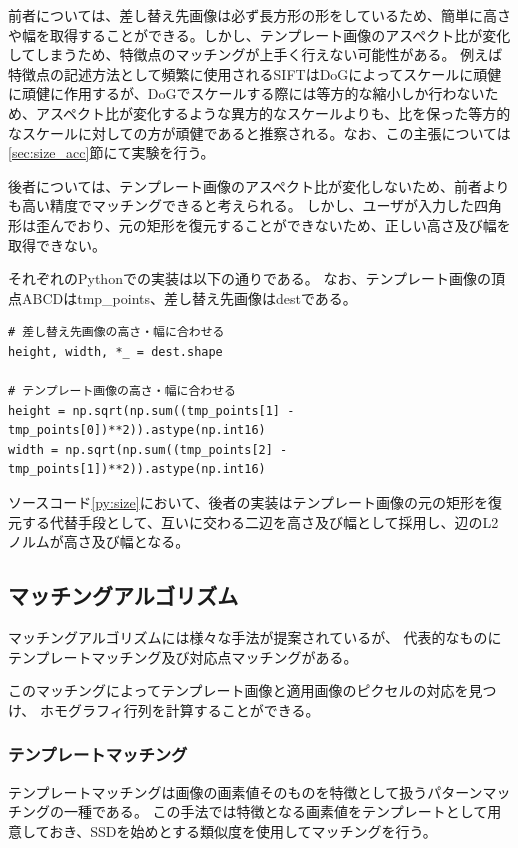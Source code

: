 前者については、差し替え先画像は必ず長方形の形をしているため、簡単に高さや幅を取得することができる。しかし、テンプレート画像のアスペクト比が変化してしまうため、特徴点のマッチングが上手く行えない可能性がある。
例えば特徴点の記述方法として頻繁に使用されるSIFT\cite{sift}はDoGによってスケールに頑健に頑健に作用するが、DoGでスケールする際には等方的な縮小しか行わないため、アスペクト比が変化するような異方的なスケールよりも、比を保った等方的なスケールに対しての方が頑健であると推察される。なお、この主張については\ref{sec:size_acc}節にて実験を行う。

後者については、テンプレート画像のアスペクト比が変化しないため、前者よりも高い精度でマッチングできると考えられる。
しかし、ユーザが入力した四角形は歪んでおり、元の矩形を復元することができないため、正しい高さ及び幅を取得できない。

それぞれのPythonでの実装は以下の通りである。
なお、テンプレート画像の頂点ABCDはtmp\_points、差し替え先画像はdestである。
\begin{lstlisting}[caption=画像サイズ, label=py:size]
# 差し替え先画像の高さ・幅に合わせる
height, width, *_ = dest.shape

# テンプレート画像の高さ・幅に合わせる
height = np.sqrt(np.sum((tmp_points[1] - tmp_points[0])**2)).astype(np.int16)
width = np.sqrt(np.sum((tmp_points[2] - tmp_points[1])**2)).astype(np.int16)
\end{lstlisting}
ソースコード\ref{py:size}において、後者の実装はテンプレート画像の元の矩形を復元する代替手段として、互いに交わる二辺を高さ及び幅として採用し、辺のL2ノルムが高さ及び幅となる。

\subsection{マッチングアルゴリズム}
マッチングアルゴリズムには様々な手法が提案されているが、
代表的なものにテンプレートマッチング及び対応点マッチングがある。

このマッチングによってテンプレート画像と適用画像のピクセルの対応を見つけ、
ホモグラフィ行列を計算することができる。

\subsubsection{テンプレートマッチング}
テンプレートマッチングは画像の画素値そのものを特徴として扱うパターンマッチングの一種である\cite{cv}。
この手法では特徴となる画素値をテンプレートとして用意しておき、SSDを始めとする類似度を使用してマッチングを行う\cite{cv}。

